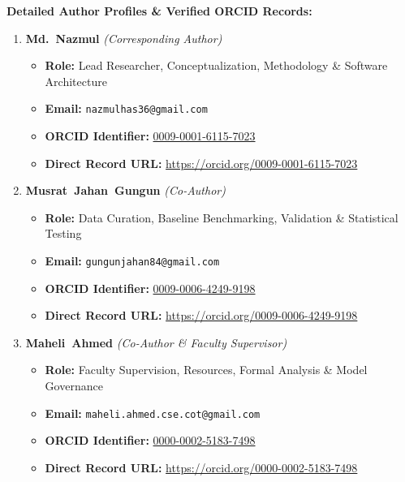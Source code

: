 \documentclass[a4paper,10pt]{article}
\begin{document}
\noindent\textbf{Detailed Author Profiles \& Verified ORCID Records:}\\[0.5ex]
\begin{enumerate}[leftmargin=*,itemsep=5pt]
    \item \textbf{Md.~Nazmul} \textit{(Corresponding Author)}
    \begin{itemize}[leftmargin=1.2em,itemsep=1pt]
        \item \textbf{Role:} Lead Researcher, Conceptualization, Methodology \& Software Architecture
        \item \textbf{Email:} \texttt{nazmulhas36@gmail.com}
        \item \textbf{ORCID Identifier:} \href{https://orcid.org/0009-0001-6115-7023}{0009-0001-6115-7023}
        \item \textbf{Direct Record URL:} \url{https://orcid.org/0009-0001-6115-7023}
    \end{itemize}

    \item \textbf{Musrat~Jahan~Gungun} \textit{(Co-Author)}
    \begin{itemize}[leftmargin=1.2em,itemsep=1pt]
        \item \textbf{Role:} Data Curation, Baseline Benchmarking, Validation \& Statistical Testing
        \item \textbf{Email:} \texttt{gungunjahan84@gmail.com}
        \item \textbf{ORCID Identifier:} \href{https://orcid.org/0009-0006-4249-9198}{0009-0006-4249-9198}
        \item \textbf{Direct Record URL:} \url{https://orcid.org/0009-0006-4249-9198}
    \end{itemize}

    \item \textbf{Maheli~Ahmed} \textit{(Co-Author \& Faculty Supervisor)}
    \begin{itemize}[leftmargin=1.2em,itemsep=1pt]
        \item \textbf{Role:} Faculty Supervision, Resources, Formal Analysis \& Model Governance
        \item \textbf{Email:} \texttt{maheli.ahmed.cse.cot@gmail.com}
        \item \textbf{ORCID Identifier:} \href{https://orcid.org/0000-0002-5183-7498}{0000-0002-5183-7498}
        \item \textbf{Direct Record URL:} \url{https://orcid.org/0000-0002-5183-7498}
    \end{itemize}
\end{enumerate}
\end{document}
